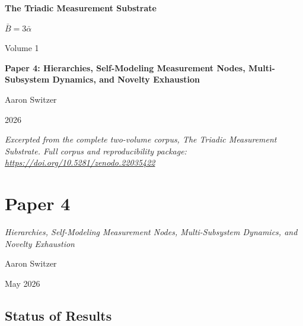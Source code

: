 \documentclass[11pt,oneside]{report}
\theoremstyle{definition}
\theoremstyle{remark}
\begin{document}
\thispagestyle{empty}
\begin{titlepage}
\centering
\vspace*{2cm}
{\sffamily\bfseries\Large The Triadic Measurement Substrate\par}
\vspace{0.6cm}
{\large $\bar{B} = 3\bar{\alpha}$\par}
\vspace{1cm}
{\sffamily\large Volume 1\par}
\vspace{1.4cm}
{\Large \bfseries Paper 4: Hierarchies, Self-Modeling Measurement Nodes, Multi-Subsystem Dynamics, and Novelty Exhaustion\par}
\vfill
{\large Aaron Switzer\par}
\vspace{0.4cm}
{\large 2026\par}
\vspace{1.2cm}
{\small\itshape Excerpted from the complete two-volume corpus, \emph{The Triadic Measurement Substrate}. Full corpus and reproducibility package: \url{https://doi.org/10.5281/zenodo.22035422}\par}
\end{titlepage}
\cleardoublepage
{}

\chapter*{Paper 4}
\begingroup\centering
{\large\itshape Hierarchies, Self-Modeling Measurement Nodes, Multi-Subsystem Dynamics, and Novelty Exhaustion\par}\vspace{0.8em}
{\normalsize Aaron Switzer\par}
{\small May 2026\par}
\endgroup\vspace{1.0em}

\par\vspace{0.6em}

\section*{Status of Results}
\end{document}

